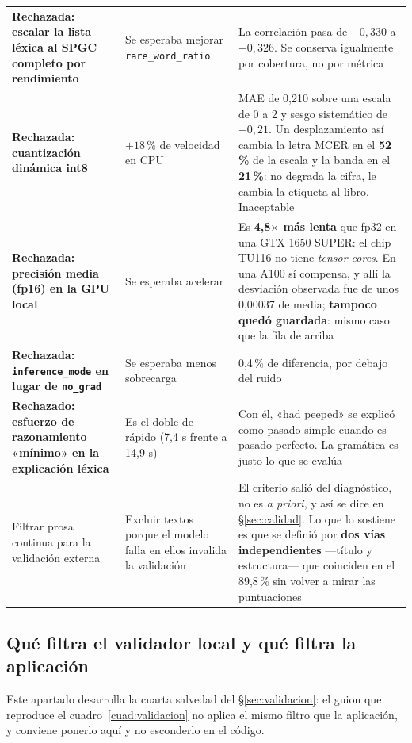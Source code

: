 \documentclass[11pt,a4paper]{article}
\newcommand{\cod}[1]{\texttt{\small #1}}
\newcommand{\pct}{\,\%}
\begin{document}
\begin{small}
\begin{longtable}{@{}L{3.7cm} L{4.0cm} L{6.0cm}@{}}
\addlinespace
\textbf{Rechazada: escalar la lista léxica al SPGC completo por rendimiento} & Se esperaba mejorar \cod{rare\_word\_ratio} & La correlación pasa de $-0{,}330$ a $-0{,}326$. Se conserva igualmente por cobertura, no por métrica \\
\addlinespace
\textbf{Rechazada: cuantización dinámica int8} & $+18\pct$ de velocidad en CPU & MAE de 0,210 sobre una escala de 0 a 2 y sesgo sistemático de $-0{,}21$. Un desplazamiento así cambia la letra MCER en el \textbf{52\pct} de la escala y la banda en el \textbf{21\pct}: no degrada la cifra, le cambia la etiqueta al libro. Inaceptable \\
\addlinespace
\textbf{Rechazada: precisión media (fp16) en la GPU local} & Se esperaba acelerar & Es \textbf{4,8$\times$ más lenta} que fp32 en una GTX 1650 SUPER: el chip TU116 no tiene \emph{tensor cores}. En una A100 sí compensa, y allí la desviación observada fue de unos 0,00037 de media; \textbf{tampoco quedó guardada}: mismo caso que la fila de arriba \\
\addlinespace
\textbf{Rechazada: \cod{inference\_mode} en lugar de \cod{no\_grad}} & Se esperaba menos sobrecarga & 0,4\pct{} de diferencia, por debajo del ruido \\
\addlinespace
\textbf{Rechazado: esfuerzo de razonamiento «mínimo» en la explicación léxica} & Es el doble de rápido (7,4 s frente a 14,9 s) & Con él, «had peeped» se explicó como pasado simple cuando es pasado perfecto. La gramática es justo lo que se evalúa \\
\addlinespace
Filtrar prosa continua para la validación externa & Excluir textos porque el modelo falla en ellos invalida la validación & El criterio salió del diagnóstico, no es \emph{a priori}, y así se dice en §\ref{sec:calidad}. Lo que lo sostiene es que se definió por \textbf{dos vías independientes} —título y estructura— que coinciden en el 89,8\pct{} sin volver a mirar las puntuaciones \\
\end{longtable}
\end{small}

\subsection{Qué filtra el validador local y qué filtra la aplicación}
\label{sec:filtro}

Este apartado desarrolla la cuarta salvedad del §\ref{sec:validacion}: el guion que
reproduce el cuadro~\ref{cuad:validacion} no aplica el mismo filtro que la aplicación, y
conviene ponerlo aquí y no esconderlo en el código.
\end{document}
